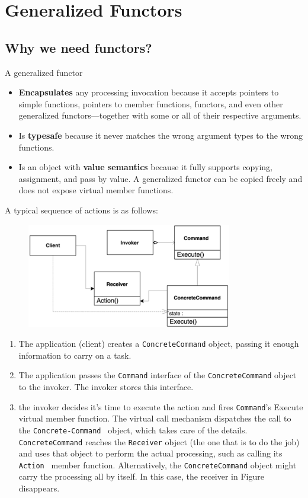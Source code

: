 \newpage
\section{Generalized Functors}

\subsection{Why we need functors?}


  A generalized functor

\begin{itemize}
\item \textbf{Encapsulates} any processing invocation because it accepts
  pointers to simple functions, pointers to member functions,
  functors, and even other generalized functors—together with some or
  all of their respective arguments.
\item Is \textbf{typesafe} because it never matches the wrong argument
  types to the wrong functions.
\item Is an object with \textbf{value semantics} because it fully
  supports copying, assignment, and pass by value. A generalized
  functor can be copied freely and does not expose virtual member
  functions.
\end{itemize}


A typical sequence of actions is as follows:

\begin{figure}[H]
  \centering
  \includegraphics[width = 0.8\textwidth]{5.Functor/Functor1.png}
\end{figure}

\begin{enumerate}
\item The application (client) creates a \texttt{ConcreteCommand}
  object, passing it enough information to carry on a task. 
\item The application passes the \texttt{Command} interface of the
  \texttt{ConcreteCommand} object to the invoker. The invoker stores
  this interface.
\item  the invoker decides it's time to execute the action and fires
  \texttt{Command}'s Execute virtual member function. The virtual call
  mechanism dispatches the call to the \texttt{Concrete-Command }
  object, which takes care of the details. \texttt{ConcreteCommand}
  reaches the \texttt{Receiver} object (the one that is to do the job)
  and uses that object to perform the actual processing, such as
  calling its \texttt{Action } member function. Alternatively, the
  \texttt{ConcreteCommand} object might carry the processing all by
  itself. In this case, the receiver in Figure disappears.
\end{enumerate}

